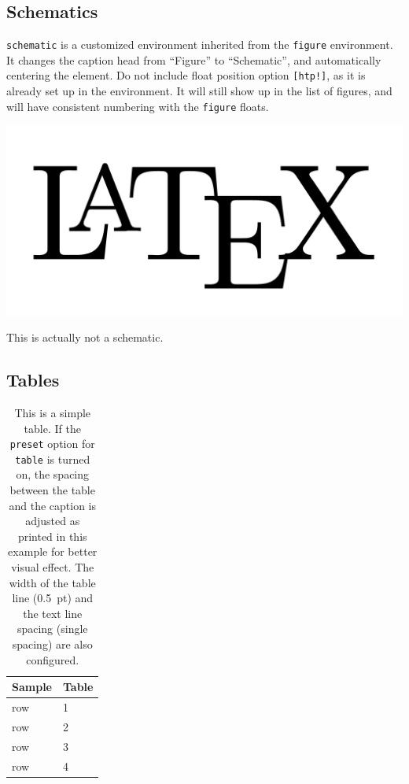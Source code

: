 \documentclass[draft]{emory}
\begin{document}
\subsection{Schematics}

\Verb|schematic| is a customized environment inherited from the \Verb|figure|
environment. It changes the caption head from ``Figure'' to ``Schematic'', and 
automatically centering the element. Do not include float position option
\Verb|[htp!]|, as it is already set up in the environment. It will still show
up in the list of figures, and will have consistent numbering with the \Verb|figure|
floats.

\begin{schematic}
  \includegraphics[width=\textwidth]{LaTeXLogo.png}
  \caption{This is actually not a schematic.\label{schematic}}
\end{schematic}


\subsection{Tables}

\begin{table}[htp!]
  \centering
  \caption{This is a simple table. \label{table} If the \protect\Verb|preset| 
  option 
  	for \protect\Verb|table| is turned on, the spacing between the table and 
  	the 
  	caption is adjusted as printed in this example for better visual effect. 
  	The width of the table line (0.5~pt) and the text line spacing (single 
  	spacing) are also configured.}
  \begin{tabular}{l p{}}
    \hline
    Sample & Table \\
    \hline 
    row & 1 \\
    row & 2 \\
    row & 3 \\
    row & 4 \\
    \hline
  \end{tabular}
\end{table}
\end{document}
